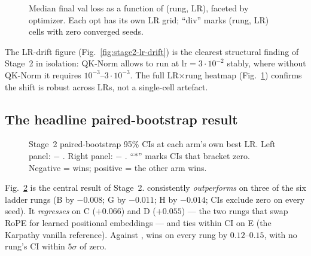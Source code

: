 \begin{figure}[h]
\centering
{}
\caption{Median final val loss as a function of (rung, LR), faceted by optimizer. Each opt has its own LR grid; ``div'' marks (rung, LR) cells with zero converged seeds.}\label{fig:stage2-heatmap}
\end{figure}

The LR-drift figure (Fig.~\ref{fig:stage2-lr-drift}) is the clearest structural finding of Stage~2 in isolation: QK-Norm allows \optCoupled{} to run at $\mathrm{lr}=3\!\cdot\!10^{-2}$ stably, where without QK-Norm it requires $10^{-3}$--$3\!\cdot\!10^{-3}$. The full LR$\times$rung heatmap (Fig.~\ref{fig:stage2-heatmap}) confirms the shift is robust across LRs, not a single-cell artefact.

\subsection{The headline paired-bootstrap result}

\begin{figure}[h]
\centering
{}
\caption{Stage~2 paired-bootstrap 95\% CIs at each arm's own best LR. Left panel: \optCoupled{} $-$ \optMuon. Right panel: \optCoupled{} $-$ \optAdamW. ``$*$'' marks CIs that bracket zero. Negative = \optCoupled{} wins; positive = the other arm wins.}\label{fig:stage2-forest}
\end{figure}

\begin{table}[h]
\centering
\caption{Stage~2 per-rung best-LR summary. The \optMuon{} $n_{\mathrm{conv}}{=}2$ rows on C, D reflect the \optMuon-at-$\mathrm{lr}{=}10^{-2}$ cell having one of its three seeds diverge on those non-QK-Norm 2-mat rungs.}\label{tab:stage2-summary}
\end{table}

Fig.~\ref{fig:stage2-forest} is the central result of Stage~2. \optCoupled{} consistently \emph{outperforms} \optMuon{} on three of the six ladder rungs (B by $-0.008$\nats; G by $-0.011$\nats; H by $-0.014$\nats; CIs exclude zero on every seed). It \emph{regresses} on C ($+0.066$\nats) and D ($+0.055$\nats) --- the two rungs that swap RoPE for learned positional embeddings --- and ties within CI on E (the Karpathy vanilla reference). Against \optAdamW, \optCoupled{} wins on every rung by $0.12$--$0.15$\nats, with no rung's CI within $5\sigma$ of zero.

